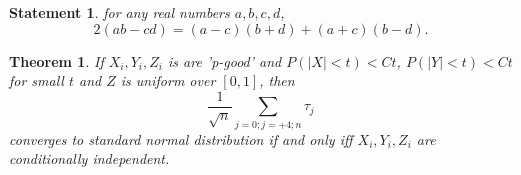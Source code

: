\documentclass{article}
\newtheorem{definition}{Definition}
\newtheorem{Theorem}{Theorem}
\newtheorem{statement}{Statement}
\begin{document}
\begin{statement}
\label{lemma:keyLemma}
 for any real numbers $a,b,c,d$, 
 \[
  2(ab -cd) = (a-c)(b+d) + (a+c)(b-d). 
 \]
\end{statement}


\begin{Theorem}
If $X_i,Y_i,Z_i$ is are 'p-good' and $P( |X| <t) <Ct$, $P( |Y| <t) <Ct$ for small $t$ and $Z$ is uniform over $[0,1]$, then
\[
 \frac{1}{\sqrt n} \sum_{j=0;j=+4;n} \tau_j   
\]
converges to standard normal distribution  if and only iff  $X_i,Y_i,Z_i$ are conditionally independent.
\end{Theorem}
\end{document}
